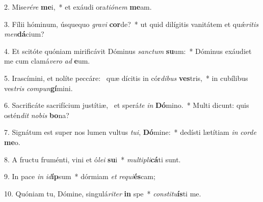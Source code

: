 2. Mise\textit{ré}\textit{re} \textbf{me}i,~*  et exáudi ora\textit{ti}\textit{ó}\textit{nem} \textbf{me}am.\

3. Fílii hóminum, úsquequo \textit{gra}\textit{vi} \textbf{cor}de?~*  ut quid dilígitis vanitátem et quǽ\textit{ri}\textit{tis} \textit{men}\textbf{dá}cium?\

4. Et scitóte quóniam mirificávit Dóminus \textit{sanc}\textit{tum} \textbf{su}um:~*  Dóminus exáudiet me cum clamá\textit{ve}\textit{ro} \textit{ad} \textbf{e}um.\

5. Irascímini, et nolíte peccáre: \dag\  quæ dícitis in cór\textit{di}\textit{bus} \textbf{ves}tris,~*  in cubílibus ves\textit{tris} \textit{com}\textit{pun}\textbf{gí}mini.\

6. Sacrificáte sacrifícium justítiæ, \dag\  et sperá\textit{te} \textit{in} \textbf{Dó}mino.~*  Multi dicunt: quis ostén\textit{dit} \textit{no}\textit{bis} \textbf{bo}na?\

7. Signátum est super nos lumen vultus \textit{tu}\textit{i}, \textbf{Dó}mine:~*  dedísti lætítiam \textit{in} \textit{cor}\textit{de} \textbf{me}o.\

8. A fructu fruménti, vini et ó\textit{le}\textit{i} \textbf{su}i~*  \textit{mul}\textit{ti}\textit{pli}\textbf{cá}ti sunt.\

9. In pace \textit{in} \textit{id}\textbf{íp}sum~*  dórmiam \textit{et} \textit{re}\textit{qui}\textbf{és}cam;\

10. Quóniam tu, Dómine, singulá\textit{ri}\textit{ter} \textbf{in} spe~*  \textit{con}\textit{sti}\textit{tu}\textbf{ís}ti me.\

